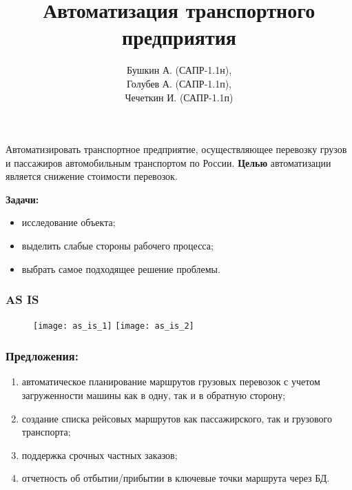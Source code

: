 \title{Автоматизация транспортного предприятия}
\author{Бушкин А. (САПР-1.1н), \\
  Голубев А. (САПР-1.1п), \\
  Чечеткин И. (САПР-1.1п)}
\institute{}
\date{}

\begin{frame}
  \titlepage
\end{frame}

\begin{frame}
  Автоматизировать транспортное предприятие, осуществляющее перевозку грузов
  и пассажиров автомобильным транспортом по России. \textbf{Целью}
  автоматизации является снижение стоимости перевозок.
  
  \vspace{5mm}
  \textbf{Задачи:}
    \begin{itemize}
      \item исследование объекта;
      \item выделить слабые стороны рабочего процесса;
      \item выбрать самое подходящее решение проблемы.
    \end{itemize}
\end{frame}

\begin{frame}
  \frametitle{AS IS}
  \begin{center}
    \begin{figure}
      \texttt{[image: as\_is\_1]}
      \texttt{[image: as\_is\_2]}
    \end{figure}
  \end{center}
\end{frame}

\begin{frame}
  \frametitle{Предложения:}
  \begin{enumerate}
    \item автоматическое планирование маршрутов грузовых перевозок с учетом
      загруженности машины как в одну, так и в обратную сторону;
    \item создание списка рейсовых маршрутов как пассажирского, так и
      грузового транспорта;
    \item поддержка срочных частных заказов;
    \item отчетность об отбытии/прибытии в ключевые точки маршрута через БД.
  \end{enumerate}
\end{frame}

